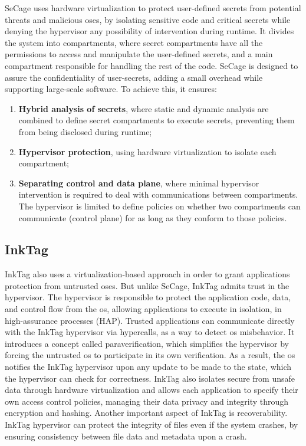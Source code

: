 SeCage \cite{SeCagePaper} uses hardware virtualization to protect user-defined secrets from potential threats and malicious \gls{os}es, by isolating sensitive code and critical secrets while denying the hypervisor any possibility of intervention during runtime.
It divides the system into compartments, where secret compartments have all the permissions to access and manipulate the user-defined secrets, and a main compartment responsible for handling the rest of the code.
SeCage is designed to assure the confidentiality of user-secrets, adding a small overhead while supporting large-scale software. To achieve this, it ensures:
\begin{enumerate}
	\item \textbf{Hybrid analysis of secrets}, where static and dynamic analysis are combined to define secret compartments to execute secrets, preventing them from being disclosed during runtime;
	\item \textbf{Hypervisor protection}, using hardware virtualization to isolate each compartment;
	\item \textbf{Separating control and data plane}, where minimal hypervisor intervention is required to deal with communications between compartments. The hypervisor is limited to define policies on whether two compartments can communicate (control plane) for as long as they conform to those policies.\newline
\end{enumerate}



\subsection{InkTag} 

InkTag \cite{inkTagPaper} also uses a virtualization-based approach in order to grant applications protection from untrusted \gls{os}es.
But unlike SeCage, InkTag admits trust in the hypervisor. The hypervisor is responsible to protect the application
code, data, and control flow from the \gls{os}, allowing applications to execute in isolation, in high-assurance processes (HAP). Trusted applications can communicate directly with the InkTag hypervisor via hypercalls, as a way to detect \gls{os} misbehavior.
It introduces a concept called paraverification, which simplifies the hypervisor by forcing the untrusted \gls{os} to participate in its own verification. As a result, the \gls{os} notifies the InkTag hypervisor upon any update to be made to the state, which the hypervisor can check for correctness. 
InkTag also isolates secure from unsafe data through hardware virtualization and allows each application to specify their own access control policies, managing their data privacy and integrity through encryption and hashing.
Another important aspect of InkTag is recoverability. InkTag hypervisor can protect the integrity of files even if the system crashes, by ensuring consistency between file data and metadata upon a crash.\newline

